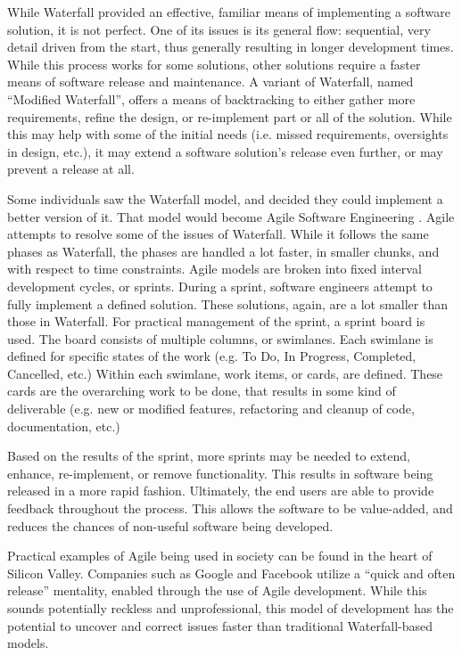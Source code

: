     \par While Waterfall provided an effective, familiar means of implementing a software solution, it is not perfect. One of its issues is its general flow: sequential, very detail driven from the start, thus generally resulting in longer development times. While this process works for some solutions, other solutions require a faster means of software release and maintenance. A variant of Waterfall, named ``Modified Waterfall'', offers a means of backtracking to either gather more requirements, refine the design, or re-implement part or all of the solution. While this may help with some of the initial needs (i.e. missed requirements, oversights in design, etc.), it may extend a software solution's release even further, or may prevent a release at all.

    \par Some individuals saw the Waterfall model, and decided they could implement a better version of it. That model would become Agile Software Engineering \cite{Sommerville2011}. Agile attempts to resolve some of the issues of Waterfall. While it follows the same phases as Waterfall, the phases are handled a lot faster, in smaller chunks, and with respect to time constraints. Agile models are broken into fixed interval development cycles, or sprints. During a sprint, software engineers attempt to fully implement a defined solution. These solutions, again, are a lot smaller than those in Waterfall. For practical management of the sprint, a sprint board is used. The board consists of multiple columns, or swimlanes. Each swimlane is defined for specific states of the work (e.g. To Do, In Progress, Completed, Cancelled, etc.) Within each swimlane, work items, or cards, are defined. These cards are the overarching work to be done, that results in some kind of deliverable (e.g. new or modified features, refactoring and cleanup of code, documentation, etc.)

    \par Based on the results of the sprint, more sprints may be needed to extend, enhance, re-implement, or remove functionality. This results in software being released in a more rapid fashion. Ultimately, the end users are able to provide feedback throughout the process. This allows the software to be value-added, and reduces the chances of non-useful software being developed.

    \par Practical examples of Agile being used in society can be found in the heart of Silicon Valley. Companies such as Google \cite{Winters2020} and Facebook \cite{Feitelson2013} utilize a ``quick and often release'' mentality, enabled through the use of Agile development. While this sounds potentially reckless and unprofessional, this model of development has the potential to uncover and correct issues faster than traditional Waterfall-based models.

